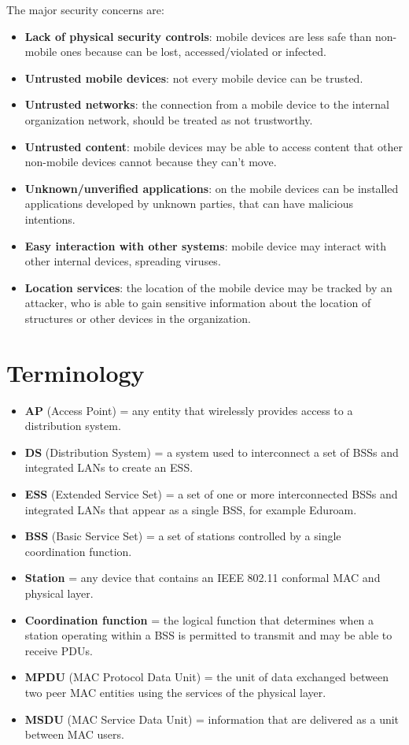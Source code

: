\documentclass[oneside]{academica}
\begin{document}
The major security concerns are:
\begin{itemize}
  \item \textbf{Lack of physical security controls}: mobile devices are less safe than non-mobile ones because can be lost, accessed/violated or infected.
  \item \textbf{Untrusted mobile devices}: not every mobile device can be trusted.
  \item \textbf{Untrusted networks}: the connection from a mobile device to the internal organization network, should be treated as not trustworthy.
  \item \textbf{Untrusted content}: mobile devices may be able to access content that other non-mobile devices cannot because they can't move.
  \item \textbf{Unknown/unverified applications}: on the mobile devices can be installed applications developed by unknown parties, that can have malicious intentions.
  \item \textbf{Easy interaction with other systems}: mobile device may interact with other internal devices, spreading viruses.
  \item \textbf{Location services}: the location of the mobile device may be tracked by an attacker, who is able to gain sensitive information about the location of structures or other devices in the organization.
\end{itemize}

\section{Terminology}

\begin{itemize}
  \item \textbf{AP} (Access Point) = any entity that wirelessly provides access to a distribution system.
  \item \textbf{DS} (Distribution System) = a system used to interconnect a set of BSSs and integrated LANs to create an ESS.
  \item \textbf{ESS} (Extended Service Set) = a set of one or more interconnected BSSs and integrated LANs that appear as a single BSS, for example Eduroam.
  \item \textbf{BSS} (Basic Service Set) = a set of stations controlled by a single coordination function.
  \item \textbf{Station} = any device that contains an IEEE 802.11 conformal MAC and physical layer.
  \item \textbf{Coordination function} = the logical function that determines when a station operating within a BSS is permitted to transmit and may be able to receive PDUs.
  \item \textbf{MPDU} (MAC Protocol Data Unit) = the unit of data exchanged between two peer MAC entities using the services of the physical layer.
  \item \textbf{MSDU} (MAC Service Data Unit) = information that are delivered as a unit between MAC users.
\end{itemize}
\end{document}

